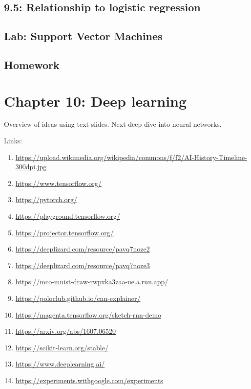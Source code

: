 \documentclass{article}
\begin{document}
\subsection*{9.5: Relationship to logistic regression}

\subsection*{Lab: Support Vector Machines}

\subsection*{Homework}

\section*{Chapter 10: Deep learning} 

Overview of ideas using text slides. Next deep dive into neural networks.

Links:
\begin{enumerate}
\item \url{https://upload.wikimedia.org/wikipedia/commons/f/f2/AI-History-Timeline-300dpi.jpg}
\item \url{https://www.tensorflow.org/}
\item \url{https://pytorch.org/}
\item \url{https://playground.tensorflow.org/}
\item \url{https://projector.tensorflow.org/}
\item \url{https://deeplizard.com/resource/pavq7noze2}
\item \url{https://deeplizard.com/resource/pavq7noze3}
\item \url{https://mco-mnist-draw-rwpxka3zaa-ue.a.run.app/}
\item \url{https://poloclub.github.io/cnn-explainer/}
\item \url{https://magenta.tensorflow.org/sketch-rnn-demo}
\item \url{https://arxiv.org/abs/1607.06520}
\item \url{https://scikit-learn.org/stable/}
\item \url{https://www.deeplearning.ai/}
\item \url{https://experiments.withgoogle.com/experiments}
\end{enumerate}
\end{document}
